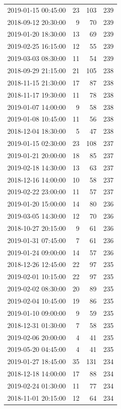 \begin{tabular}{lrrr}
2019-01-15 00:45:00 & 23 & 103 & 239 \\
2018-09-12 20:30:00 & 9 & 70 & 239 \\
2019-01-20 18:30:00 & 13 & 69 & 239 \\
2019-02-25 16:15:00 & 12 & 55 & 239 \\
2019-03-03 08:30:00 & 11 & 54 & 239 \\
2018-09-29 21:15:00 & 21 & 105 & 238 \\
2018-11-15 21:30:00 & 17 & 87 & 238 \\
2018-11-17 19:30:00 & 11 & 78 & 238 \\
2019-01-07 14:00:00 & 9 & 58 & 238 \\
2019-01-08 10:45:00 & 11 & 56 & 238 \\
2018-12-04 18:30:00 & 5 & 47 & 238 \\
2019-01-15 02:30:00 & 23 & 108 & 237 \\
2019-01-21 20:00:00 & 18 & 85 & 237 \\
2019-02-18 14:30:00 & 13 & 63 & 237 \\
2018-12-16 14:00:00 & 10 & 58 & 237 \\
2019-02-22 23:00:00 & 11 & 57 & 237 \\
2019-01-20 15:00:00 & 14 & 80 & 236 \\
2019-03-05 14:30:00 & 12 & 70 & 236 \\
2018-10-27 20:15:00 & 9 & 61 & 236 \\
2019-01-31 07:45:00 & 7 & 61 & 236 \\
2019-01-24 09:00:00 & 14 & 57 & 236 \\
2018-12-26 12:45:00 & 22 & 97 & 235 \\
2019-02-01 10:15:00 & 22 & 97 & 235 \\
2019-02-02 08:30:00 & 20 & 89 & 235 \\
2019-02-04 10:45:00 & 19 & 86 & 235 \\
2019-01-10 09:00:00 & 9 & 59 & 235 \\
2018-12-31 01:30:00 & 7 & 58 & 235 \\
2019-02-06 20:00:00 & 4 & 41 & 235 \\
2019-05-20 04:45:00 & 4 & 41 & 235 \\
2019-01-27 18:45:00 & 35 & 131 & 234 \\
2018-12-18 14:00:00 & 17 & 88 & 234 \\
2019-02-24 01:30:00 & 11 & 77 & 234 \\
2018-11-01 20:15:00 & 12 & 64 & 234 \\

\end{tabular}

